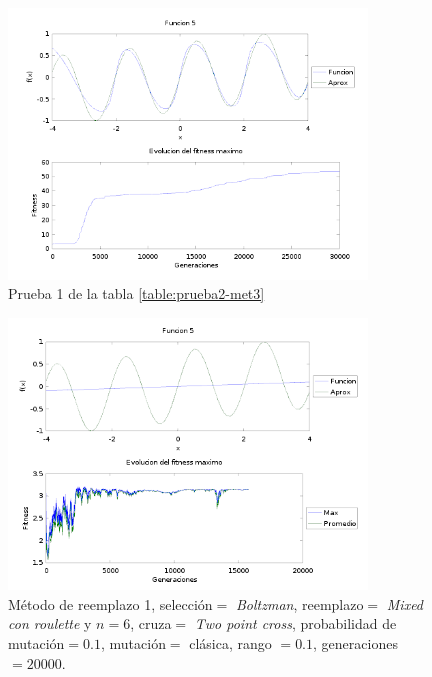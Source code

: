\documentclass[11pt,a4paper]{article}
\begin{document}
\begin{figure}[h]
\centering
\includegraphics[width=0.85\textwidth]{img/39.png}
\caption{\label{fig:39} Prueba 1 de la tabla \ref{table:prueba2-met3}}
\end{figure}

\begin{figure}[h]
\centering
\includegraphics[width=0.85\textwidth]{img/best-met1.png}
\caption{\label{fig:best-met1} Método de reemplazo 1, selección$=$ \emph{Boltzman}, reemplazo$=$ \emph{Mixed con roulette} y $n=6$, cruza$=$ \emph{Two point cross}, probabilidad de mutación$=0.1$, mutación$=$ clásica, rango $=0.1$, generaciones $= 20000$.}
\end{figure}
\end{document}
